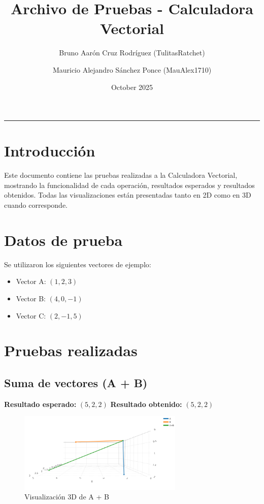 \documentclass[12pt,a4paper]{article}
\title{\textbf{Archivo de Pruebas - Calculadora Vectorial}}
\author{Bruno Aarón Cruz Rodríguez (TulitasRatchet)\and Mauricio Alejandro Sánchez Ponce (MauAlex1710)}
\date{October 2025}
\begin{document}
\maketitle
\hrule
\vspace{1em}

\section*{Introducción}
Este documento contiene las pruebas realizadas a la Calculadora Vectorial, mostrando la funcionalidad de cada operación, resultados esperados y resultados obtenidos. Todas las visualizaciones están presentadas tanto en 2D como en 3D cuando corresponde.

\section{Datos de prueba}
Se utilizaron los siguientes vectores de ejemplo:

\begin{itemize}
    \item Vector A: $(1, 2, 3)$
    \item Vector B: $(4, 0, -1)$
    \item Vector C: $(2, -1, 5)$
\end{itemize}


\section{Pruebas realizadas}

\subsection{Suma de vectores (A + B)}
\textbf{Resultado esperado:} $(5, 2, 2)$  
\textbf{Resultado obtenido:} $(5, 2, 2)$  

\begin{figure}[H]
    \centering
    \includegraphics[width=0.7\textwidth]{imagenes/suma_ab.png} %
    \caption{Visualización 3D de A + B}
\end{figure}
\end{document}
